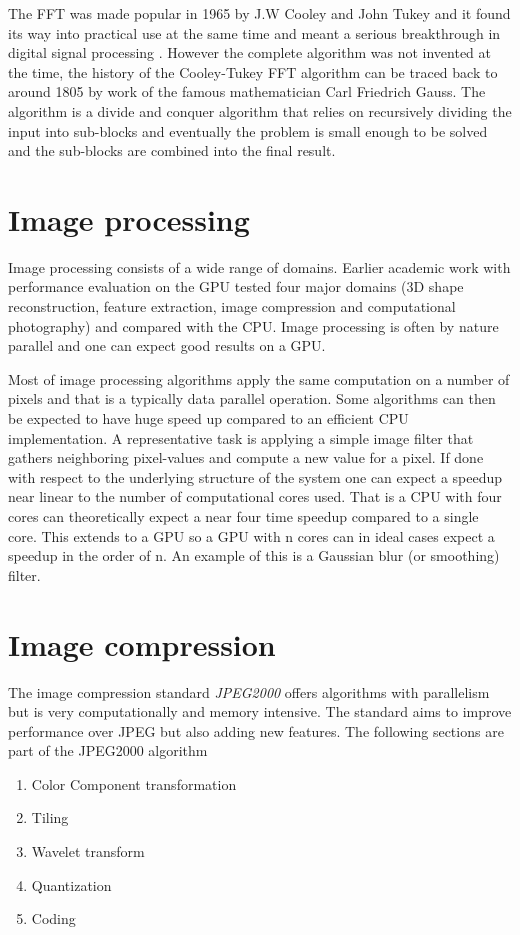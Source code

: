 The FFT was made popular in 1965\cite{cooley1965algorithm} by J.W Cooley and John Tukey and it found its way into practical use at the same time and meant a serious breakthrough in digital signal processing \cite{cooley1969fast, brigham1967fast}. However the complete algorithm was not invented at the time, the history of the Cooley-Tukey \gls{FFT} algorithm can be traced back to around 1805 by work of the famous mathematician Carl Friedrich Gauss\cite{heideman1984gauss}. The algorithm is a divide and conquer algorithm that relies on recursively dividing the input into sub-blocks and eventually the problem is small enough to be solved and the sub-blocks are combined into the final result.
\section{Image processing}
Image processing consists of a wide range of domains. Earlier academic work with performance evaluation on the \gls{GPU}\cite{park2011design} tested four major domains (\gls{3D} shape reconstruction, feature extraction, image compression and computational photography) and compared with the \gls{CPU}. Image processing is often by nature parallel and one can expect good results on a \gls{GPU}.

Most of image processing algorithms apply the same computation on a number of pixels and that is a typically data parallel operation. Some algorithms can then be expected to have huge speed up compared to an efficient \gls{CPU} implementation. A representative task is applying a simple image filter that gathers neighboring pixel-values and compute a new value for a pixel. If done with respect to the underlying structure of the system one can expect a speedup near linear to the number of computational cores used. That is a \gls{CPU} with four cores can theoretically expect a near four time speedup compared to a single core. This extends to a \gls{GPU} so a \gls{GPU} with n cores can in ideal cases expect a speedup in the order of n. An example of this is a Gaussian blur (or smoothing) filter.

\section{Image compression}
The image compression standard \emph{JPEG2000} offers algorithms with parallelism but is very computationally and memory intensive. The standard aims to improve performance over JPEG but also adding new features. The following sections are part of the JPEG2000 algorithm\cite{christopoulos2000jpeg2000}
\begin{enumerate}
	\item Color Component transformation
	\item Tiling
	\item Wavelet transform
	\item Quantization
	\item Coding
\end{enumerate}

